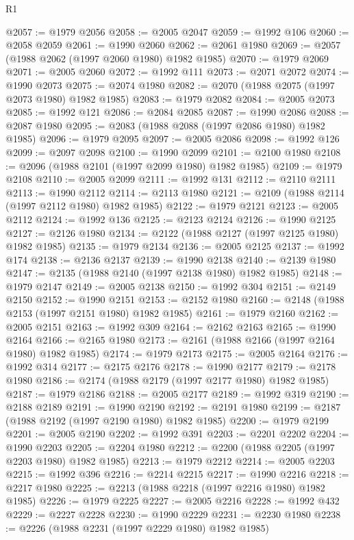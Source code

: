 \begin{lexlean}{R1}
\begin{coremodule}
@2057 := @1979 @2056
@2058 := @2005 @2047
@2059 := @1992 @106
@2060 := @2058 @2059
@2061 := @1990 @2060
@2062 := @2061 @1980
@2069 := @2057 (@1988 @2062 (@1997 @2060 @1980) @1982 @1985)
@2070 := @1979 @2069
@2071 := @2005 @2060
@2072 := @1992 @111
@2073 := @2071 @2072
@2074 := @1990 @2073
@2075 := @2074 @1980
@2082 := @2070 (@1988 @2075 (@1997 @2073 @1980) @1982 @1985)
@2083 := @1979 @2082
@2084 := @2005 @2073
@2085 := @1992 @121
@2086 := @2084 @2085
@2087 := @1990 @2086
@2088 := @2087 @1980
@2095 := @2083 (@1988 @2088 (@1997 @2086 @1980) @1982 @1985)
@2096 := @1979 @2095
@2097 := @2005 @2086
@2098 := @1992 @126
@2099 := @2097 @2098
@2100 := @1990 @2099
@2101 := @2100 @1980
@2108 := @2096 (@1988 @2101 (@1997 @2099 @1980) @1982 @1985)
@2109 := @1979 @2108
@2110 := @2005 @2099
@2111 := @1992 @131
@2112 := @2110 @2111
@2113 := @1990 @2112
@2114 := @2113 @1980
@2121 := @2109 (@1988 @2114 (@1997 @2112 @1980) @1982 @1985)
@2122 := @1979 @2121
@2123 := @2005 @2112
@2124 := @1992 @136
@2125 := @2123 @2124
@2126 := @1990 @2125
@2127 := @2126 @1980
@2134 := @2122 (@1988 @2127 (@1997 @2125 @1980) @1982 @1985)
@2135 := @1979 @2134
@2136 := @2005 @2125
@2137 := @1992 @174
@2138 := @2136 @2137
@2139 := @1990 @2138
@2140 := @2139 @1980
@2147 := @2135 (@1988 @2140 (@1997 @2138 @1980) @1982 @1985)
@2148 := @1979 @2147
@2149 := @2005 @2138
@2150 := @1992 @304
@2151 := @2149 @2150
@2152 := @1990 @2151
@2153 := @2152 @1980
@2160 := @2148 (@1988 @2153 (@1997 @2151 @1980) @1982 @1985)
@2161 := @1979 @2160
@2162 := @2005 @2151
@2163 := @1992 @309
@2164 := @2162 @2163
@2165 := @1990 @2164
@2166 := @2165 @1980
@2173 := @2161 (@1988 @2166 (@1997 @2164 @1980) @1982 @1985)
@2174 := @1979 @2173
@2175 := @2005 @2164
@2176 := @1992 @314
@2177 := @2175 @2176
@2178 := @1990 @2177
@2179 := @2178 @1980
@2186 := @2174 (@1988 @2179 (@1997 @2177 @1980) @1982 @1985)
@2187 := @1979 @2186
@2188 := @2005 @2177
@2189 := @1992 @319
@2190 := @2188 @2189
@2191 := @1990 @2190
@2192 := @2191 @1980
@2199 := @2187 (@1988 @2192 (@1997 @2190 @1980) @1982 @1985)
@2200 := @1979 @2199
@2201 := @2005 @2190
@2202 := @1992 @391
@2203 := @2201 @2202
@2204 := @1990 @2203
@2205 := @2204 @1980
@2212 := @2200 (@1988 @2205 (@1997 @2203 @1980) @1982 @1985)
@2213 := @1979 @2212
@2214 := @2005 @2203
@2215 := @1992 @396
@2216 := @2214 @2215
@2217 := @1990 @2216
@2218 := @2217 @1980
@2225 := @2213 (@1988 @2218 (@1997 @2216 @1980) @1982 @1985)
@2226 := @1979 @2225
@2227 := @2005 @2216
@2228 := @1992 @432
@2229 := @2227 @2228
@2230 := @1990 @2229
@2231 := @2230 @1980
@2238 := @2226 (@1988 @2231 (@1997 @2229 @1980) @1982 @1985)

\end{coremodule}
\end{lexlean}
